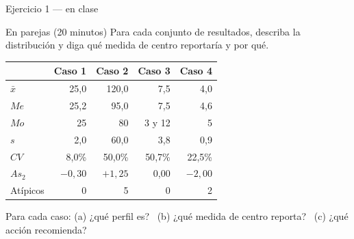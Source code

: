 \documentclass[aspectratio=169,10pt]{beamer}
\begin{document}
\begin{frame}{Ejercicio 1 — en clase}
  \begin{alertblock}{En parejas (20 minutos)}
    \scriptsize
    Para cada conjunto de resultados, describa la distribución  y diga qué medida de centro reportaría y por qué.

    \vspace{0.15cm}
    \centering
    \begin{tabular}{@{}lrrrr@{}}
      \toprule
      & \textbf{Caso 1} & \textbf{Caso 2} & \textbf{Caso 3} & \textbf{Caso 4} \\
      \midrule
      $\bar{x}$ & 25{,}0 & 120{,}0 & 7{,}5 & 4{,}0 \\
      $Me$      & 25{,}2 &  95{,}0 & 7{,}5 & 4{,}6 \\
      $Mo$      & 25 & 80 & 3 y 12 & 5 \\
      $s$       &  2{,}0 &  60{,}0 & 3{,}8 & 0{,}9 \\
      $CV$      &  8{,}0\% & 50{,}0\% & 50{,}7\% & 22{,}5\% \\
      $As_2$    & $-0{,}30$ & $+1{,}25$ & 0{,}00 & $-2{,}00$ \\
      Atípicos  & 0 & 5 & 0 & 2 \\
      \bottomrule
    \end{tabular}

    \vspace{0.15cm}
    \raggedright
    Para cada caso: (a) ¿qué perfil es? \ (b) ¿qué medida de centro reporta? \
    (c) ¿qué acción recomienda?
  \end{alertblock}
\end{frame}
\end{document}
